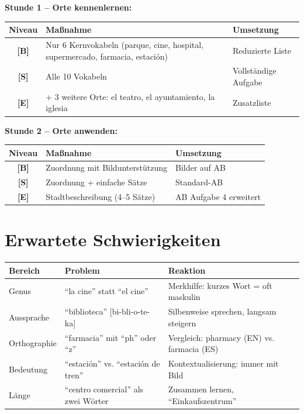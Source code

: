 \documentclass[11pt,a4paper]{article}
\newcommand{\basis}{\textcolor{basis}{\textbf{[B]}}}
\newcommand{\standard}{\textcolor{standard}{\textbf{[S]}}}
\newcommand{\erweiterung}{\textcolor{erweiterung}{\textbf{[E]}}}
\begin{document}
\begin{diffbox}

\textbf{Stunde 1 -- Orte kennenlernen:}

\begin{tabularx}{\textwidth}{|c|X|X|}
\hline
\textbf{Niveau} & \textbf{Maßnahme} & \textbf{Umsetzung} \\
\hline
\basis & Nur 6 Kernvokabeln (parque, cine, hospital, supermercado, farmacia, estación) & Reduzierte Liste \\
\hline
\standard & Alle 10 Vokabeln & Vollständige Aufgabe \\
\hline
\erweiterung & + 3 weitere Orte: el teatro, el ayuntamiento, la iglesia & Zusatzliste \\
\hline
\end{tabularx}

\vspace{1em}

\textbf{Stunde 2 -- Orte anwenden:}

\begin{tabularx}{\textwidth}{|c|X|X|}
\hline
\textbf{Niveau} & \textbf{Maßnahme} & \textbf{Umsetzung} \\
\hline
\basis & Zuordnung mit Bildunterstützung & Bilder auf AB \\
\hline
\standard & Zuordnung + einfache Sätze & Standard-AB \\
\hline
\erweiterung & Stadtbeschreibung (4--5 Sätze) & AB Aufgabe 4 erweitert \\
\hline
\end{tabularx}

\end{diffbox}

\vspace{1em}

\section*{Erwartete Schwierigkeiten}

\begin{tabularx}{\textwidth}{|l|X|X|}
\hline
\textbf{Bereich} & \textbf{Problem} & \textbf{Reaktion} \\
\hline
Genus & ``la cine'' statt ``el cine'' & Merkhilfe: kurzes Wort = oft maskulin \\
\hline
Aussprache & ``biblioteca'' [bi-bli-o-te-ka] & Silbenweise sprechen, langsam steigern \\
\hline
Orthographie & ``farmacia'' mit ``ph'' oder ``z'' & Vergleich: pharmacy (EN) vs. farmacia (ES) \\
\hline
Bedeutung & ``estación'' vs. ``estación de tren'' & Kontextualisierung: immer mit Bild \\
\hline
Länge & ``centro comercial'' als zwei Wörter & Zusammen lernen, ``Einkaufszentrum'' \\
\hline
\end{tabularx}
\end{document}
